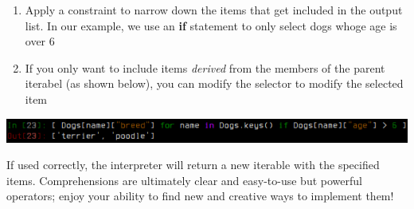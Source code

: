 \documentclass[11pt]{article}
\begin{document}
\begin{enumerate}
	\setcounter{enumi}{\theenumTemp}
	\item{Apply a constraint to narrow down the items that get included in the output list. In our example, we use an \textbf{if} statement to only select dogs whoge age is over 6}
	\item{If you only want to include items \emph{derived} from the members of the parent iterabel (as shown below), you can modify the selector to modify the selected item}
\end{enumerate}

\vfill
\begin{center}
	\includegraphics[width=.75\linewidth]{./figures/comp2.png}
	\label{comp2} %
\end{center}

If used correctly, the interpreter will return a new iterable with the specified items. Comprehensions are ultimately clear and easy-to-use but powerful operators; enjoy your ability to find new and creative ways to implement them!



\printbibliography
\end{document}
